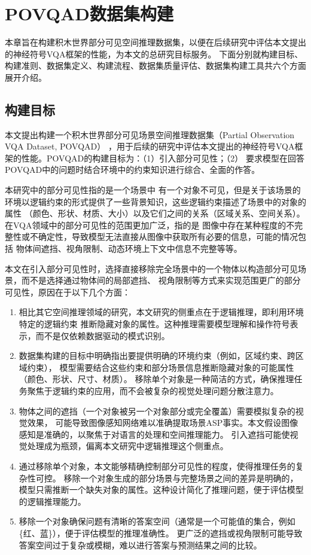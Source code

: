 \chapter{POVQAD数据集构建}
\label{dataset}
本章旨在构建积木世界部分可见空间推理数据集，以便在后续研究中评估本文提出的神经符号VQA框架的性能，为本文的总研究目标服务。
下面分别就构建目标、构建准则、数据集定义、构建流程、数据集质量评估、数据集构建工具共六个方面展开介绍。
\section{构建目标}
本文提出构建一个积木世界部分可见场景空间推理数据集（Partial Observation VQA Data\-set, POVQAD）
，用于后续的研究中评估本文提出的神经符号VQA框架的性能。POVQAD的构建目标为：（1）引入部分可见性；（2）
要求模型在回答POVQAD中的问题时结合环境中的约束知识进行综合、全面的作答。

本研究中的部分可见性指的是一个场景中
有一个对象不可见，但是关于该场景的环境以逻辑约束的形式提供了一些背景知识，这些逻辑约束描述了场景中的对象的属性
（颜色、形状、材质、大小）以及它们之间的关系（区域关系、空间关系）。在VQA领域中的部分可见性的范围更加广泛，指的是
图像中存在某种程度的不完整性或不确定性，导致模型无法直接从图像中获取所有必要的信息，可能的情况包括
物体间遮挡、视角限制、动态环境上下文中信息不完整等等。

本文在引入部分可见性时，选择直接移除完全场景中的一个物体以构造部分可见场景，而不是选择通过物体间的局部遮挡、
视角限制等方式来实现范围更广的部分可见性，原因在于以下几个方面：
\begin{enumerate}[nosep]
\item 相比其它空间推理领域的研究，本文研究的侧重点在于逻辑推理，即利用环境特定的逻辑约束
推断隐藏对象的属性。这种推理需要模型理解和操作符号表示，而不是仅依赖数据驱动的模式识别。
\item 数据集构建的目标中明确指出要提供明确的环境约束（例如，区域约束、跨区域约束），
模型需要结合这些约束和部分场景信息推断隐藏对象的可能属性（颜色、形状、尺寸、材质）。
移除单个对象是一种简洁的方式，确保推理任务聚焦于逻辑约束的应用，而不会被复杂的视觉处理问题分散注意力。
\item 物体之间的遮挡（一个对象被另一个对象部分或完全覆盖）需要模拟复杂的视觉效果，
可能导致图像感知网络难以准确提取场景ASP事实。本文假设图像感知是准确的，以聚焦于对语言的处理和空间推理能力。
引入遮挡可能使视觉处理成为瓶颈，偏离本文研究中逻辑推理这个侧重点。
\item 通过移除单个对象，本文能够精确控制部分可见性的程度，使得推理任务的复杂性可控。
移除一个对象生成的部分场景与完整场景之间的差异是明确的，模型只需推断一个缺失对象的属性。这种设计简化了推理问题，便于评估模型的逻辑推理能力。
\item 移除一个对象确保问题有清晰的答案空间（通常是一个可能值的集合，例如\{红、蓝\}），便于评估模型的推理准确性。
更广泛的遮挡或视角限制可能导致答案空间过于复杂或模糊，难以进行答案与预测结果之间的比较。
\end{enumerate}

